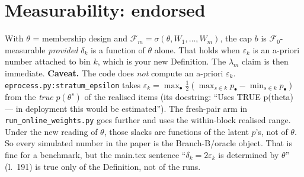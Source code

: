 \documentclass[11pt]{article}
\begin{document}
\section{Measurability: endorsed}
With $\theta$ = membership design and $\mathcal F_m=\sigma(\theta,W_1,\dots,W_m)$, the cap $b$ is $\mathcal F_0$-measurable \emph{provided} $\delta_k$ is a function of $\theta$ alone. That holds when $\varepsilon_k$ is an a-priori number attached to bin $k$, which is your new Definition. The $\lambda_m$ claim is then immediate. \textbf{Caveat.} The code does \emph{not} compute an a-priori $\varepsilon_k$. \texttt{eprocess.py:stratum\_epsilon} takes $\varepsilon_k=\max_{\bullet}\frac12(\max_{s\in k}p_\bullet-\min_{s\in k}p_\bullet)$ from the \emph{true} $p(\theta^s)$ of the realised items (its docstring: ``Uses TRUE p(theta) --- in deployment this would be estimated''). The fresh-pair arm in \texttt{run\_online\_weights.py} goes further and uses the within-block realised range. Under the new reading of $\theta$, those slacks are functions of the latent $p$'s, not of $\theta$. So every simulated number in the paper is the Branch-B/oracle object. That is fine for a benchmark, but the main.tex sentence ``$\delta_k=2\varepsilon_k$ is determined by $\theta$'' (l.~191) is true only of the Definition, not of the runs.
\end{document}
